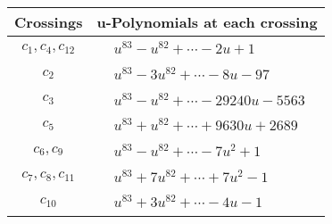 \documentclass[1p]{elsarticle_modified}
\theoremstyle{definition}
\begin{document}
\begin{tabular}{m{50pt}|m{274pt}}
Crossings & \hspace{64pt}u-Polynomials at each crossing \\
\hline $$\begin{aligned}c_{1},c_{4},c_{12}\end{aligned}$$&$\begin{aligned}
&u^{83}- u^{82}+\cdots-2 u+1
\end{aligned}$\\
\hline $$\begin{aligned}c_{2}\end{aligned}$$&$\begin{aligned}
&u^{83}-3 u^{82}+\cdots-8 u-97
\end{aligned}$\\
\hline $$\begin{aligned}c_{3}\end{aligned}$$&$\begin{aligned}
&u^{83}- u^{82}+\cdots-29240 u-5563
\end{aligned}$\\
\hline $$\begin{aligned}c_{5}\end{aligned}$$&$\begin{aligned}
&u^{83}+u^{82}+\cdots+9630 u+2689
\end{aligned}$\\
\hline $$\begin{aligned}c_{6},c_{9}\end{aligned}$$&$\begin{aligned}
&u^{83}- u^{82}+\cdots-7 u^2+1
\end{aligned}$\\
\hline $$\begin{aligned}c_{7},c_{8},c_{11}\end{aligned}$$&$\begin{aligned}
&u^{83}+7 u^{82}+\cdots+7 u^2-1
\end{aligned}$\\
\hline $$\begin{aligned}c_{10}\end{aligned}$$&$\begin{aligned}
&u^{83}+3 u^{82}+\cdots-4 u-1
\end{aligned}$\\
\hline
\end{tabular}\\~\\
\newpage\renewcommand{\arraystretch}{1}
\end{document}
